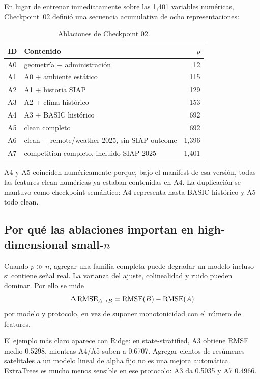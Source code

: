 En lugar de entrenar inmediatamente sobre las 1,401 variables numéricas, Checkpoint~02 definió
una secuencia acumulativa de ocho representaciones:

\begin{table}[H]
\centering
\caption{Ablaciones de Checkpoint 02.}
\label{tab:cp02-ablations}
\small
\begin{tabular}{llr}
\toprule
ID & Contenido & $p$ \\
\midrule
A0 & geometría + administración & 12 \\
A1 & A0 + ambiente estático & 115 \\
A2 & A1 + historia SIAP & 129 \\
A3 & A2 + clima histórico & 153 \\
A4 & A3 + BASIC histórico & 692 \\
A5 & clean completo & 692 \\
A6 & clean + remote/weather 2025, sin SIAP outcome & 1,396 \\
A7 & competition completo, incluido SIAP 2025 & 1,401 \\
\bottomrule
\end{tabular}
\end{table}

A4 y A5 coinciden numéricamente porque, bajo el manifest de esa versión, todas las features
clean numéricas ya estaban contenidas en A4. La duplicación se mantuvo como checkpoint
semántico: A4 representa hasta BASIC histórico y A5 todo clean.

\subsection{Por qué las ablaciones importan en high-dimensional small-\texorpdfstring{$n$}{n}}

Cuando $p\gg n$, agregar una familia completa puede degradar un modelo incluso si contiene
señal real. La varianza del ajuste, colinealidad y ruido pueden dominar. Por ello se mide
\begin{equation}
\Delta\operatorname{RMSE}_{A\rightarrow B}
=
\operatorname{RMSE}(B)-\operatorname{RMSE}(A)
\label{eq:ablation-delta}
\end{equation}
por modelo y protocolo, en vez de suponer monotonicidad con el número de features.

El ejemplo más claro aparece con Ridge: en state-stratified, A3 obtiene RMSE medio 0.5298,
mientras A4/A5 suben a 0.6707. Agregar cientos de resúmenes satelitales a un modelo lineal de
alpha fijo no es una mejora automática. ExtraTrees es mucho menos sensible en ese protocolo:
A3 da 0.5035 y A7 0.4966.

